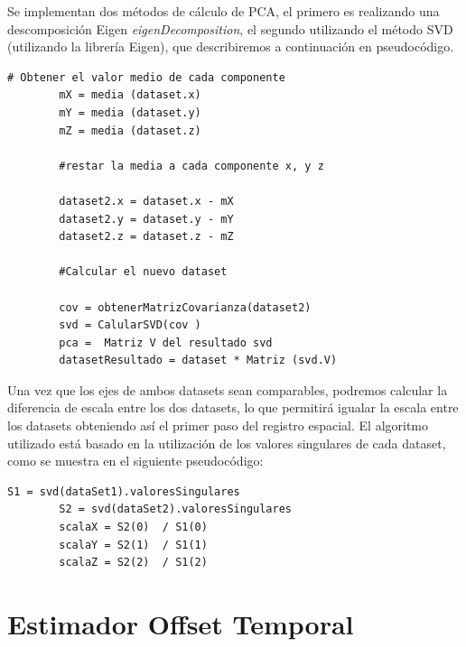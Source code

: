 	Se implementan dos métodos de cálculo de PCA, el primero es realizando una descomposición Eigen \textit{eigenDecomposition}, el segundo utilizando el método SVD (utilizando la librería Eigen), que describiremos a continuación en pseudocódigo.

	\begin{lstlisting}[frame=single]
		# Obtener el valor medio de cada componente
		mX = media (dataset.x)
		mY = media (dataset.y)
		mZ = media (dataset.z)

		#restar la media a cada componente x, y z

		dataset2.x = dataset.x - mX
		dataset2.y = dataset.y - mY
		dataset2.z = dataset.z - mZ
        
        #Calcular el nuevo dataset

		cov = obtenerMatrizCovarianza(dataset2)
		svd = CalularSVD(cov )
		pca =  Matriz V del resultado svd
		datasetResultado = dataset * Matriz (svd.V)

	\end{lstlisting}

    Una vez que los ejes de ambos datasets sean comparables, podremos calcular la diferencia de escala entre los dos datasets, lo que permitirá igualar la escala entre los datasets obteniendo así el primer paso del registro espacial. El algoritmo utilizado está basado en la utilización de los valores singulares de cada dataset, como se muestra en el siguiente pseudocódigo:

        
	\begin{lstlisting}[frame=single]
		S1 = svd(dataSet1).valoresSingulares
		S2 = svd(dataSet2).valoresSingulares
		scalaX = S2(0)  / S1(0)
		scalaY = S2(1)  / S1(1)
		scalaZ = S2(2)  / S1(2)
	\end{lstlisting}

\section{Estimador Offset Temporal}

